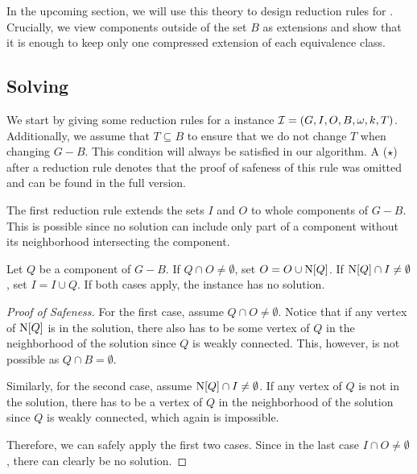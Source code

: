 \begin{theorem}
\begin{lemma}
\begin{theorem}
\begin{lemma}
In the upcoming section, we will use this theory to design reduction rules for \scsborder{}. Crucially, we view components outside of the set $B$ as extensions and show that it is enough to keep only one compressed extension of each equivalence class.

\subsection{Solving \scsborder{}}\label{sec:solving_scc}

We start by giving some reduction rules for a \scsborder{} instance $\mathcal{I} = (G, I, O, B, \operatorname{\omega},  k, T)$. Additionally, we assume that $T \subseteq B$ to ensure that we do not change $T$ when changing $G - B$. This condition will always be satisfied in our algorithm.
\ifshort
A ($\star$) after a reduction rule denotes that the proof of safeness of this rule was omitted and can be found in the full version.
\fi

The first reduction rule extends the sets $I$ and $O$ to whole components of $G - B$. This is possible since no solution can include only part of a component without its neighborhood intersecting the component.

\iflong
\begin{reduction*}
\else
\begin{reduction*}[$\star$]
\fi
\label{red:in_out}
  Let $Q$ be a component of $G - B$. If $Q \cap O \ne \emptyset$, set $O = O \cup \operatorname{N}[{Q}]$. If $\operatorname{N}[{Q}] \cap I \ne \emptyset$, set $I = I \cup Q$. If both cases apply, the instance has no solution.
\end{reduction*} 
\iflong
\begin{proof}[Proof of Safeness]
  For the first case, assume $Q \cap O \ne \emptyset$. Notice that if any vertex of $\operatorname{N}[{Q}]$ is in the solution, there also has to be some vertex of $Q$ in the neighborhood of the solution since $Q$ is weakly connected. This, however, is not possible as $Q \cap B = \emptyset$.

  Similarly, for the second case, assume $\operatorname{N}[{Q}] \cap I \ne \emptyset$. If any vertex of $Q$ is not in the solution, there has to be a vertex of $Q$ in the neighborhood of the solution since $Q$ is weakly connected, which again is impossible. 
  
  Therefore, we can safely apply the first two cases. Since in the last case $I \cap O \ne \emptyset$, there can clearly be no solution.
\end{proof}
\fi


\end{reduction*}
\end{lemma}
\end{theorem}
\end{lemma}
\end{theorem}
